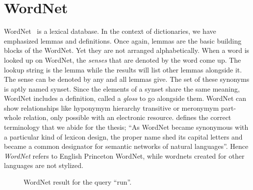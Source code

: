 \section{WordNet}%
\label{sec:wordnet}
WordNet~\cite{fellbaum_wordnet_1998-1} is a lexical database.
In the context of dictionaries, we have emphasized lemmas and definitions.
Once again, lemmas are the basic building blocks of the WordNet.
Yet they are not arranged alphabetically.
When a word is looked up on WordNet, the \emph{senses} that are denoted by the word come up.
The lookup string is the lemma while the results will list other lemmas alongside it.
The sense can be denoted by any and all lemmas give.
The set of these synonyms is aptly named synset.
Since the elements of a synset share the same meaning, WordNet includes a definition, called a \emph{gloss} to go alongside them.
WordNet can show relationships like hyponymym hierarchy transitive or meronymym part-whole relation, only possible with an electronic resource.
\textcite{fellbaum_semantic_1998} defines the correct terminology that we abide for the thesis; \enquote{As WordNet became synonymous with a particular kind of lexicon design, the proper name shed its capital letters and became a common designator for semantic networks of natural languages}.
Hence \emph{WordNet} refers to English Princeton WordNet, while wordnets created for other languages are not stylized.
\begin{figure}[!hbp]
    \begin{center}
        {%
            \setlength{\fboxsep}{1pt}%
            \setlength{\fboxrule}{1pt}%
        }%
    \caption{WordNet result for the query \enquote{run}.}\label{fig:example_run}
    \end{center}
\end{figure}

